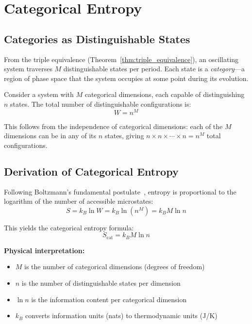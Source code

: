 \section{Categorical Entropy}
\label{sec:categorical}

\subsection{Categories as Distinguishable States}

From the triple equivalence (Theorem~\ref{thm:triple_equivalence}), an oscillating system traverses $M$ distinguishable states per period. Each state is a \textit{category}—a region of phase space that the system occupies at some point during its evolution.

Consider a system with $M$ categorical dimensions, each capable of distinguishing $n$ states. The total number of distinguishable configurations is:
\begin{equation}
W = n^M
\end{equation}

This follows from the independence of categorical dimensions: each of the $M$ dimensions can be in any of its $n$ states, giving $n \times n \times \cdots \times n = n^M$ total configurations.

\subsection{Derivation of Categorical Entropy}

Following Boltzmann's fundamental postulate~\cite{boltzmann1877}, entropy is proportional to the logarithm of the number of accessible microstates:
\begin{equation}
S = k_B \ln W = k_B \ln(n^M) = k_B M \ln n
\end{equation}

This yields the categorical entropy formula:
\begin{equation}
\boxed{S_{\text{cat}} = k_B M \ln n}
\label{eq:categorical_entropy}
\end{equation}

\textbf{Physical interpretation:}
\begin{itemize}
\item $M$ is the number of categorical dimensions (degrees of freedom)
\item $n$ is the number of distinguishable states per dimension
\item $\ln n$ is the information content per categorical dimension
\item $k_B$ converts information units (nats) to thermodynamic units (J/K)
\end{itemize}



